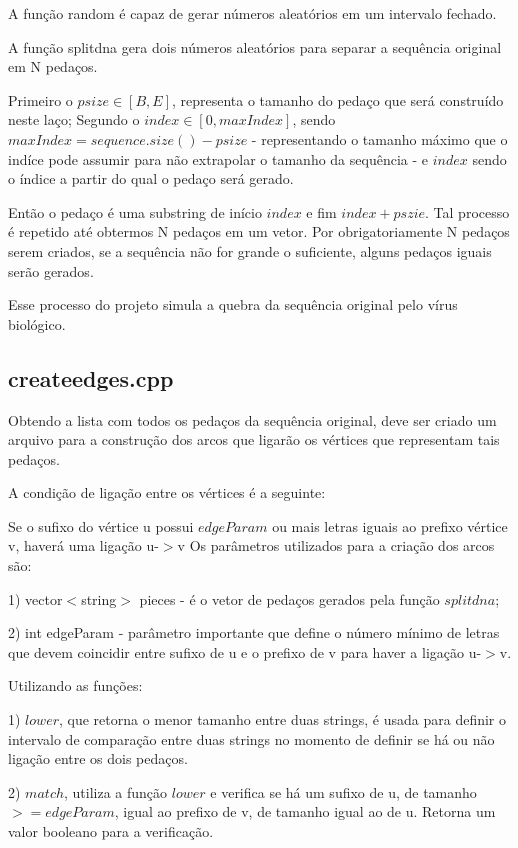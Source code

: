 \documentclass{article}
\begin{document}
\begin{multicols}{2}
A função random é capaz de gerar números aleatórios em um intervalo fechado.

A função splitdna gera dois números aleatórios para separar a sequência original em N pedaços.

Primeiro o $psize \in [B, E]$, representa o tamanho do pedaço que será construído neste laço;
Segundo o $index \in [0, maxIndex]$, sendo $maxIndex = sequence.size() - psize$ - representando o tamanho máximo que o indíce pode assumir para não extrapolar o tamanho da sequência - e $index$ sendo o índice a partir do qual o pedaço será gerado.

Então o pedaço é uma substring de início $index$ e fim $index + pszie$.
Tal processo é repetido até obtermos N pedaços em um vetor. Por obrigatoriamente N pedaços serem criados, se a sequência não for grande o suficiente, alguns pedaços iguais serão gerados.

Esse processo do projeto simula a quebra da sequência original pelo vírus biológico.

\subsection{createedges.cpp}

Obtendo a lista com todos os pedaços da sequência original, deve ser criado um arquivo para a construção dos arcos que ligarão os vértices que representam tais pedaços.

A condição de ligação entre os vértices é a seguinte:

Se o sufixo do vértice u possui $edgeParam$ ou mais letras iguais ao prefixo vértice v, haverá uma ligação u-$>$v
Os parâmetros utilizados para a criação dos arcos são:

1) vector$<$string$>$ pieces - é o vetor de pedaços gerados pela função $splitdna$;

2) int edgeParam - parâmetro importante que define o número mínimo de letras que devem coincidir entre sufixo de u e o prefixo de v para haver a ligação u-$>$v.

Utilizando as funções:

1) $lower$, que retorna o menor tamanho entre duas strings, é usada para definir o intervalo de comparação entre duas strings no momento de definir se há ou não ligação entre os dois pedaços.

2) $match$, utiliza a função $lower$ e verifica se há um sufixo de u, de tamanho $>= edgeParam$, igual ao prefixo de v, de tamanho igual ao de u. Retorna um valor booleano para a verificação.


\end{multicols}
\end{document}
